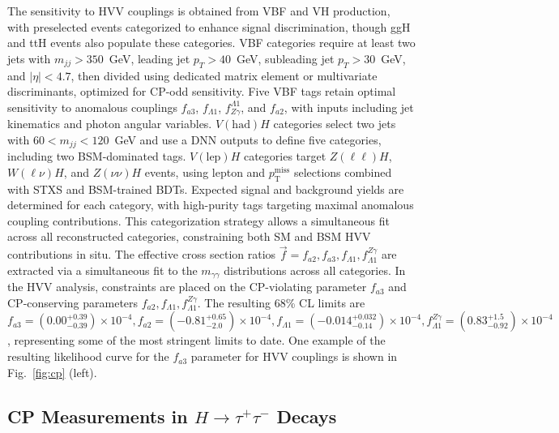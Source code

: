 \documentclass[a4paper,11pt]{article}
\begin{document}
The sensitivity to HVV couplings is obtained from VBF and VH
production, with preselected events categorized to enhance signal
discrimination, though ggH and ttH events also populate these
categories. VBF categories require at least two jets with $m_{jj} >
350$~GeV, leading jet $p_T > 40$~GeV, subleading jet $p_T > 30$~GeV,
and $|\eta| < 4.7$, then divided using dedicated matrix element or
multivariate discriminants, optimized for CP-odd sensitivity. Five VBF
tags retain optimal sensitivity to anomalous couplings $f_{a3}$,
$f_{\Lambda1}$, $f_{Z\gamma}^{\Lambda1}$, and $f_{a2}$, with inputs
including jet kinematics and photon angular variables.
%
$V(\mathrm{had})H$ categories select two jets with $60 < m_{jj} <
120$~GeV and use a DNN outputs to define five categories, including
two BSM-dominated tags. $V(\mathrm{lep})H$ categories target
$Z(\ell\ell)H$, $W(\ell\nu)H$, and $Z(\nu\nu)H$ events, using lepton
and $p_\mathrm{T}^{\text{miss}}$ selections combined with STXS and
BSM-trained BDTs.  Expected signal and background yields are
determined for each category, with high-purity tags targeting maximal
anomalous coupling contributions. This categorization strategy allows
a simultaneous fit across all reconstructed categories, constraining
both SM and BSM HVV contributions in situ.
%
The effective cross section ratios \(\vec{f} = f_{a2}, f_{a3},
f_{\Lambda 1}, f^{Z\gamma}_{\Lambda 1}\) are extracted via a
simultaneous fit to the \(m_{\gamma\gamma}\) distributions across all
categories.  In the HVV analysis, constraints are placed on the
CP-violating parameter \(f_{a3}\) and CP-conserving parameters
\(f_{a2}, f_{\Lambda 1}, f^{Z\gamma}_{\Lambda 1}\).  The resulting
68\% CL limits are \(f_{a3} = (0.00^{+0.39}_{-0.39})\times10^{-4},
f_{a2} = (-0.81^{+0.65}_{-2.0})\times10^{-4}, f_{\Lambda 1} =
(-0.014^{+0.032}_{-0.14})\times10^{-4}, f^{Z\gamma}_{\Lambda 1} =
(0.83^{+1.5}_{-0.92})\times10^{-4}\), representing some of the most
stringent limits to date. One example of the resulting likelihood
curve for the $f_{a3}$ parameter for HVV couplings is shown in
Fig.~\ref{fig:cp} (left).





\subsection{CP Measurements in $H\to \tau^+\tau^-$ Decays}
\end{document}
